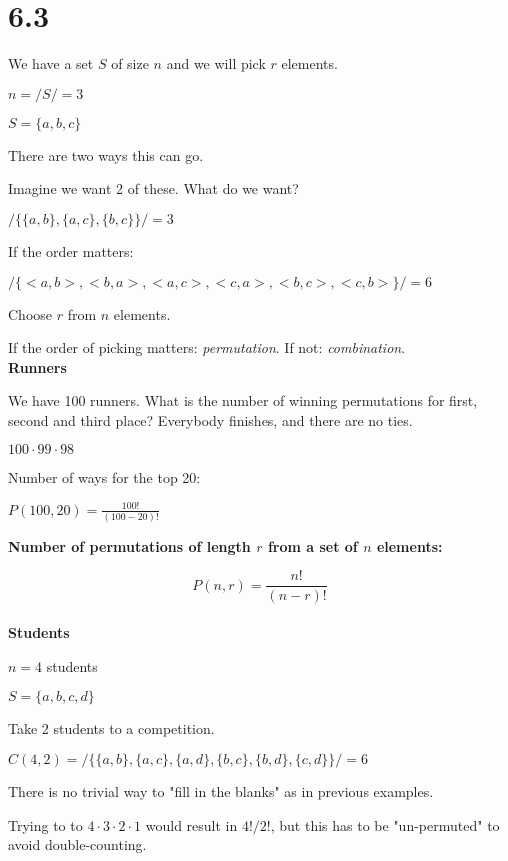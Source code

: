\documentclass{exam}
\begin{document}
	
    \section{6.3}
    
    We have a set $S$ of size $n$ and we will pick $r$ elements.
    
    $n = /S/ = 3$
    
    $S = \{a,b,c\}$
    
    There are two ways this can go.
    
    Imagine we want 2 of these. What do we want?
    
    $/ \{ \{a,b\}, \{a,c\}, \{b,c\} \} / = 3$
    
    If the order matters:
    
    $/ \{   <a,b>, <b,a>, <a,c>, <c,a>, <b,c>, <c,b>  \} /  = 6$
    
    Choose $r$ from $n$ elements.
    
    If the order of picking matters: \textit{permutation}. If not: \textit{combination}.\\
    
    \textbf{Runners}
    
    We have 100 runners. What is the number of winning permutations for first, second and third place? Everybody finishes, and there are no ties.
    
    $100 \cdot 99 \cdot 98$

    Number of ways for the top 20:
    
    $P(100,20) = \frac{100!}{(100-20)!}$
    
    \textbf{Number of permutations of length $r$ from a set of $n$ elements:}
    
    $$P(n,r) = \frac{n!}{(n-r)!}$$\\
    
    \textbf{Students}
    
    $n = 4$ students
    
    $S = \{a,b,c,d \}$
    
    Take 2 students to a competition.
    
    $C(4,2) = / \{ \{a,b\}, \{a,c\}, \{a,d\}, \{b, c\}, \{b,d\}, \{c,d\} \} / = 6$
    
    There is no trivial way to "fill in the blanks" as in previous examples.
    
    Trying to to $4 \cdot 3 \cdot 2 \cdot 1$ would result in $4!/2!$, but this has to be "un-permuted" to avoid double-counting.
    
\end{document}
